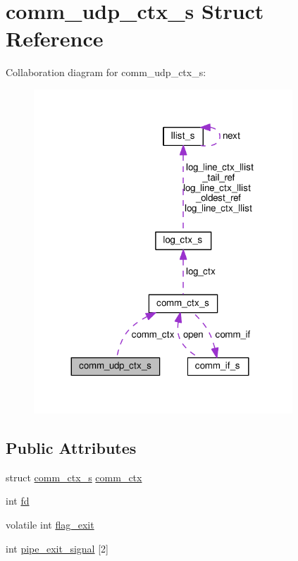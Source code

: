 \hypertarget{structcomm__udp__ctx__s}{}\section{comm\+\_\+udp\+\_\+ctx\+\_\+s Struct Reference}
\label{structcomm__udp__ctx__s}


Collaboration diagram for comm\+\_\+udp\+\_\+ctx\+\_\+s\+:\nopagebreak
\begin{figure}[H]
\begin{center}
\leavevmode
\includegraphics[width=275pt]{structcomm__udp__ctx__s__coll__graph}
\end{center}
\end{figure}
\subsection*{Public Attributes}
\begin{DoxyCompactItemize}
\item 
struct \hyperlink{structcomm__ctx__s}{comm\+\_\+ctx\+\_\+s} \hyperlink{structcomm__udp__ctx__s_a3732c33a70c43d9f270ab912cc23d94b}{comm\+\_\+ctx}
\item 
int \hyperlink{structcomm__udp__ctx__s_a65be1c0c98d73e09419c3507a4c4535b}{fd}
\item 
volatile int \hyperlink{structcomm__udp__ctx__s_a3478e148fc2c7e2a11d0ecf1f064ad27}{flag\+\_\+exit}
\item 
int \hyperlink{structcomm__udp__ctx__s_af98857f20d566dca629dbe52a7f8e57c}{pipe\+\_\+exit\+\_\+signal} \mbox{[}2\mbox{]}
\end{DoxyCompactItemize}


